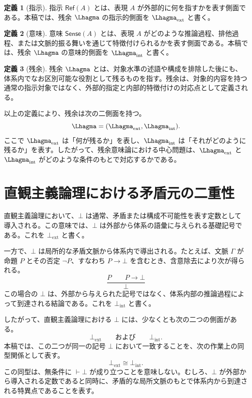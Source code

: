 \documentclass[11pt,a4paper]{article}
\newcommand{\refe}{\mathsf{Ref}}
\newcommand{\sense}{\mathsf{Sense}}
\newcommand{\ctx}{\Gamma}
\newcommand{\botext}{\bot_{\mathrm{ext}}}
\newcommand{\botint}{\bot_{\mathrm{int}}}
\newcommand{\lext}{\Lhagma_{\mathrm{ext}}}
\newcommand{\lint}{\Lhagma_{\mathrm{int}}}
\theoremstyle{definition}
\newtheorem{definition}{定義}[section]
\begin{document}
\begin{definition}[指示]
指示 $\refe(A)$ とは、表現 $A$ が外部的に何を指すかを表す側面である。本稿では、残余 $\Lhagma$ の指示的側面を $\lext$ と書く。
\end{definition}

\begin{definition}[意味]
意味 $\sense(A)$ とは、表現 $A$ がどのような推論過程、排他過程、または文脈的振る舞いを通じて特徴付けられるかを表す側面である。本稿では、残余 $\Lhagma$ の意味的側面を $\lint$ と書く。
\end{definition}

\begin{definition}[残余]
残余 $\Lhagma$ とは、対象水準の述語や構成を排除した後にも、体系内でなお区別可能な役割として残るものを指す。残余は、対象的内容を持つ通常の指示対象ではなく、外部的指定と内部的特徴付けの対応点として定義される。
\end{definition}

以上の定義により、残余は次の二側面を持つ。
\[
\Lhagma = (\lext, \lint).
\]
ここで $\lext$ は「何が残るか」を表し、$\lint$ は「それがどのように残るか」を表す。したがって、残余意味論における中心問題は、$\lext$ と $\lint$ がどのような条件のもとで対応するかである。

\section{直観主義論理における矛盾元の二重性}

直観主義論理において、$\bot$ は通常、矛盾または構成不可能性を表す定数として導入される。この意味では、$\bot$ は外部から体系の語彙に与えられる基礎記号である。これを $\botext$ と書く。

一方で、$\bot$ は局所的な矛盾文脈から体系内で導出される。たとえば、文脈 $\ctx$ が命題 $P$ とその否定 $\neg P$、すなわち $P \to \bot$ を含むとき、含意除去により次が得られる。
\[
\frac{P \qquad P \to \bot}{\bot}
\]
この場合の $\bot$ は、外部から与えられた記号ではなく、体系内部の推論過程によって到達される結論である。これを $\botint$ と書く。

したがって、直観主義論理における $\bot$ には、少なくとも次の二つの側面がある。
\[
\botext \qquad \text{および} \qquad \botint .
\]
本稿では、この二つが同一の記号 $\bot$ において一致することを、次の作業上の同型関係として表す。
\[
\botext \cong \botint .
\]
この同型は、無条件に $\vdash \bot$ が成り立つことを意味しない。むしろ、$\bot$ が外部から導入される定数であると同時に、矛盾的な局所文脈のもとで体系内から到達される特異点であることを表す。
\end{document}
